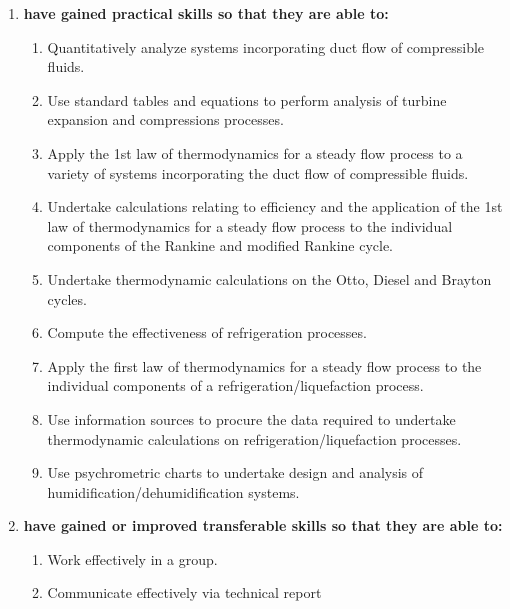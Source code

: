 \documentclass[12pts,a4paper,amsmath,amssymb,floatfix]{article}%
\begin{document}
\begin{enumerate}[{\bf A.}]
\item {\bf have gained practical skills so that they are able to:}
  \begin{enumerate}
    \item Quantitatively analyze systems incorporating duct flow of compressible fluids.
    \item Use standard tables and equations to perform analysis of turbine expansion and compressions processes.
    \item Apply the 1st law of thermodynamics for a steady flow process to a variety of systems incorporating the duct flow of compressible fluids.
    \item Undertake calculations relating to efficiency and the application of the 1st law of thermodynamics for a steady flow process to the individual components of the Rankine and modified Rankine cycle.
    \item Undertake thermodynamic calculations on the Otto, Diesel and Brayton cycles.
    \item Compute the effectiveness of refrigeration processes.
    \item Apply the first law of thermodynamics for a steady flow process to the individual components of a refrigeration/liquefaction process.
    \item Use information sources to procure the data required to undertake thermodynamic calculations on refrigeration/liquefaction processes.
    \item Use psychrometric charts to undertake design and analysis of humidification/dehumidification systems.
  \end{enumerate}

\item {\bf have gained or improved transferable skills so that they are able to:}
  \begin{enumerate}
    \item Work effectively in a group.
    \item Communicate effectively via technical report
  \end{enumerate}
\end{enumerate}


\end{document}
